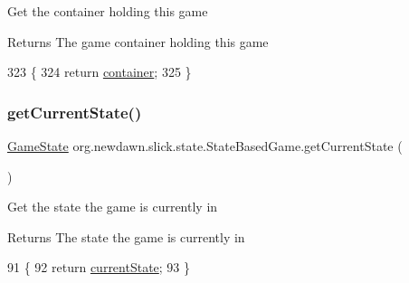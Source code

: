 Get the container holding this game

\begin{DoxyReturn}{Returns}
The game container holding this game 
\end{DoxyReturn}

\begin{DoxyCode}
323                                         \{
324         \textcolor{keywordflow}{return} \mbox{\hyperlink{classorg_1_1newdawn_1_1slick_1_1state_1_1_state_based_game_a538846600436175cbed48450adfdd025}{container}};
325     \}
\end{DoxyCode}
\mbox{\label{classorg_1_1newdawn_1_1slick_1_1state_1_1_state_based_game_a596eb5cb482d3de9bb2f77912bdb4bf6}} 
\subsubsection{\texorpdfstring{get\+Current\+State()}{getCurrentState()}}
{\footnotesize\ttfamily \mbox{\hyperlink{interfaceorg_1_1newdawn_1_1slick_1_1state_1_1_game_state}{Game\+State}} org.\+newdawn.\+slick.\+state.\+State\+Based\+Game.\+get\+Current\+State (\begin{DoxyParamCaption}{ }\end{DoxyParamCaption})\hspace{0.3cm}{\ttfamily [inline]}}

Get the state the game is currently in

\begin{DoxyReturn}{Returns}
The state the game is currently in 
\end{DoxyReturn}

\begin{DoxyCode}
91                                        \{
92         \textcolor{keywordflow}{return} \mbox{\hyperlink{classorg_1_1newdawn_1_1slick_1_1state_1_1_state_based_game_a6a45e68094bb9b7ec30b8a8b7d415766}{currentState}};
93     \}
\end{DoxyCode}
\mbox{\label{classorg_1_1newdawn_1_1slick_1_1state_1_1_state_based_game_a44b9f05525f801a4f3fbfd85c22aa236}} 
